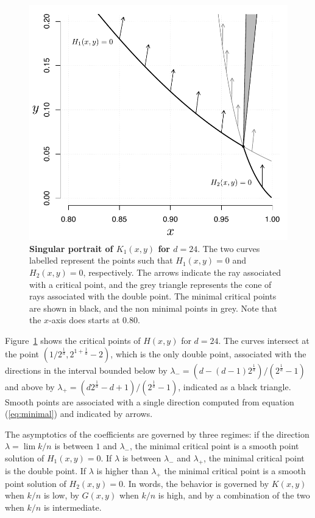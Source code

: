 \documentclass{article}
\begin{document}
\begin{figure}[h]
\centering
\includegraphics[scale=0.55]{Fig5.pdf}
\caption{\textbf{Singular portrait of $K_1(x,y)$ for $d=24$}. The two
curves labelled represent the points such that $H_1(x,y) = 0$ and
$H_2(x,y) = 0$, respectively. The arrows indicate the ray associated with
a critical point, and the grey triangle represents the cone of rays
associated with the double point. The minimal critical points are shown in
black, and the non minimal points in grey. Note that the $x$-axis does
starts at 0.80.}
\label{fig:singular}
\end{figure}

Figure~\ref{fig:singular} shows the critical points of $H(x,y)$ for
$d=24$. The curves intersect at the point $\left( 1/2^{\frac{1}{d}},
2^{1+\frac{1}{d}}-2 \right)$, which is the only double point, associated
with the directions in the interval bounded below by $\lambda_- =
(d-(d-1)2^{\frac{1}{d}}) / (2^{\frac{1}{d}}-1)$ and above by $\lambda_+ =
(d2^{\frac{1}{d}}-d+1) / (2^{\frac{1}{d}}-1)$, indicated as a black
triangle.  Smooth points are associated with a single direction computed
from equation (\ref{eq:minimal}) and indicated by arrows.

The asymptotics of the coefficients are governed by three regimes: if the
direction $\lambda = \lim k/n$ is between $1$ and $\lambda_-$, the minimal
critical point is a smooth point solution of $H_1(x,y) = 0$. If $\lambda$
is between $\lambda_-$ and $\lambda_+$, the minimal critical point is the
double point. If $\lambda$ is higher than $\lambda_+$ the minimal critical
point is a smooth point solution of $H_2(x,y) = 0$. In words, the behavior
is governed by $K(x,y)$ when $k/n$ is low, by $G(x,y)$ when $k/n$ is high,
and by a combination of the two when $k/n$ is intermediate.
\end{document}
